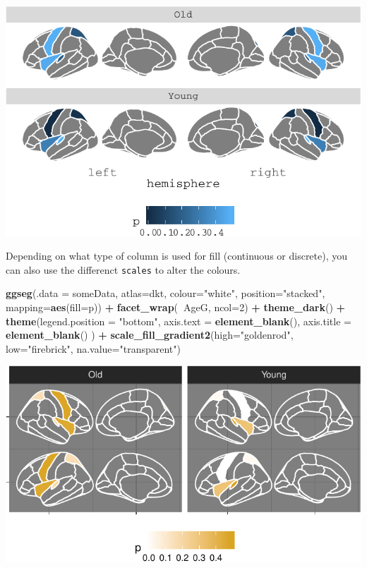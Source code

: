 \documentclass[fleqn,10pt]{wlpeerj} %
\newenvironment{Shaded}{\begin{snugshade}}{\end{snugshade}}
\newcommand{\DataTypeTok}[1]{\textcolor[rgb]{0.13,0.29,0.53}{#1}}
\newcommand{\DecValTok}[1]{\textcolor[rgb]{0.00,0.00,0.81}{#1}}
\newcommand{\KeywordTok}[1]{\textcolor[rgb]{0.13,0.29,0.53}{\textbf{#1}}}
\newcommand{\NormalTok}[1]{#1}
\newcommand{\OperatorTok}[1]{\textcolor[rgb]{0.81,0.36,0.00}{\textbf{#1}}}
\newcommand{\StringTok}[1]{\textcolor[rgb]{0.31,0.60,0.02}{#1}}
\begin{document}
\includegraphics{draft_1_files/figure-latex/datasupp3-1.pdf}

Depending on what type of column is used for fill (continuous or discrete),
you can also use the differenct \texttt{scales} to alter the colours.

\begin{Shaded}
\begin{Highlighting}[]
\KeywordTok{ggseg}\NormalTok{(}\DataTypeTok{.data =}\NormalTok{ someData, }\DataTypeTok{atlas=}\NormalTok{dkt, }
      \DataTypeTok{colour=}\StringTok{"white"}\NormalTok{, }\DataTypeTok{position=}\StringTok{"stacked"}\NormalTok{,}
      \DataTypeTok{mapping=}\KeywordTok{aes}\NormalTok{(}\DataTypeTok{fill=}\NormalTok{p)) }\OperatorTok{+}
\StringTok{  }\KeywordTok{facet_wrap}\NormalTok{(}\OperatorTok{~}\NormalTok{AgeG, }\DataTypeTok{ncol=}\DecValTok{2}\NormalTok{) }\OperatorTok{+}
\StringTok{  }\KeywordTok{theme_dark}\NormalTok{() }\OperatorTok{+}
\StringTok{  }\KeywordTok{theme}\NormalTok{(}\DataTypeTok{legend.position =} \StringTok{"bottom"}\NormalTok{,}
        \DataTypeTok{axis.text =} \KeywordTok{element_blank}\NormalTok{(),}
        \DataTypeTok{axis.title =} \KeywordTok{element_blank}\NormalTok{()}
\NormalTok{        ) }\OperatorTok{+}
\StringTok{  }\KeywordTok{scale_fill_gradient2}\NormalTok{(}\DataTypeTok{high=}\StringTok{"goldenrod"}\NormalTok{,}
                       \DataTypeTok{low=}\StringTok{"firebrick"}\NormalTok{,}
                       \DataTypeTok{na.value=}\StringTok{"transparent"}\NormalTok{)}
\end{Highlighting}
\end{Shaded}

\includegraphics{draft_1_files/figure-latex/datasupp5-1.pdf}
\end{document}
